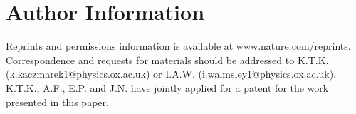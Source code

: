 \documentclass[12pt]{iopart}
\begin{document}
\section*{Author Information} 
Reprints and permissions information is available at www.nature.com/reprints. Correspondence and requests for materials should be addressed to K.T.K. (k.kaczmarek1@physics.ox.ac.uk) or I.A.W. (i.walmsley1@physics.ox.ac.uk). K.T.K., A.F., E.P. and J.N. have jointly applied for a patent for the work presented in this paper.
\end{document}

